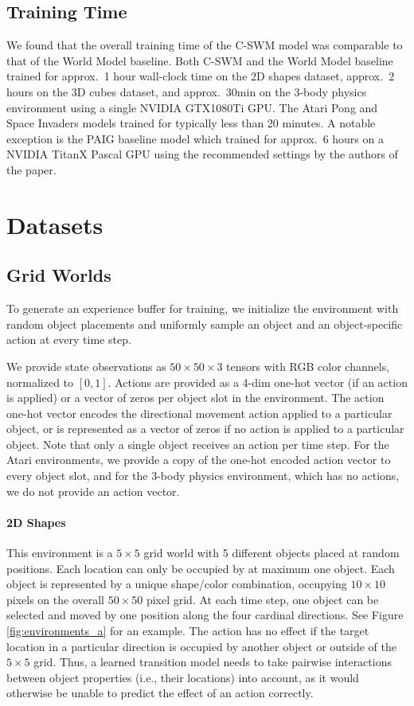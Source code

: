 \documentclass{article} %
\begin{document}
\subsection{Training Time}
We found that the overall training time of the C-SWM model was comparable to that of the World Model baseline. Both C-SWM and the World Model baseline trained for approx.~1 hour wall-clock time on the 2D shapes dataset, approx.~2 hours on the 3D cubes dataset, and approx.~30min on the 3-body physics environment using a single NVIDIA GTX1080Ti GPU. The Atari Pong and Space Invaders models trained for typically less than 20 minutes. A notable exception is the PAIG baseline model \citep{jaques2019physics} which trained for approx.~6 hours on a NVIDIA TitanX Pascal GPU using the recommended settings by the authors of the paper.

\section{Datasets}
\label{sec:datasets}
\subsection{Grid Worlds}
To generate an experience buffer for training, we initialize the environment with random object placements and uniformly sample an object and an object-specific action at every time step.

We provide state observations as $50\times 50\times 3$ tensors with RGB color channels, normalized to $[0, 1]$. Actions are provided as a 4-dim one-hot vector (if an action is applied) or a vector of zeros per object slot in the environment. The action one-hot vector encodes the directional movement action applied to a particular object, or is represented as a vector of zeros if no action is applied to a particular object. Note that only a single object receives an action per time step. For the Atari environments, we provide a copy of the one-hot encoded action vector to every object slot, and for the 3-body physics environment, which has no actions, we do not provide an action vector.

\paragraph{2D Shapes}
This environment is a $5\times 5$ grid world with 5 different objects placed at random positions. Each location can only be occupied by at maximum one object. Each object is represented by a unique shape/color combination, occupying $10\times 10$ pixels on the overall $50 \times 50$ pixel grid. At each time step, one object can be selected and moved by one position along the four cardinal directions. See Figure \ref{fig:environments_a} for an example. The action has no effect if the target location in a particular direction is occupied by another object or outside of the $5\times 5$ grid. Thus, a learned transition model needs to take pairwise interactions between object properties (i.e., their locations) into account, as it would otherwise be unable to predict the effect of an action correctly.
\end{document}
